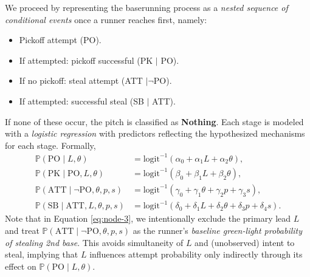 \documentclass[12pt,letterpaper]{article}
\renewcommand{\P}{\mathbb{P}}
\begin{document}
We proceed by representing the baserunning process as a \emph{nested sequence of conditional events} once a runner reaches first, namely:
\begin{itemize}
    \item Pickoff attempt (PO).
    \item If attempted: pickoff successful (PK $\mid$ PO).
    \item If no pickoff: steal attempt (ATT $\mid \neg$PO).
    \item If attempted: successful steal (SB $\mid$ ATT).
\end{itemize}
If none of these occur, the pitch is classified as \textbf{Nothing}. Each stage is modeled with a \emph{logistic regression} with predictors reflecting the hypothesized mechanisms for each stage. Formally,
\begin{align}
    \P(\text{PO}\mid L, \theta) &= \text{logit}^{-1}(\alpha_0 + \alpha_1 L + \alpha_2 \theta), \label{eq:node-1} \\
    \P(\text{PK}\mid \text{PO}, L, \theta) &= \text{logit}^{-1}(\beta_0 + \beta_1 L + \beta_2 \theta),\label{eq:node-2} \\
    \P(\text{ATT}\mid \neg\text{PO}, \theta, p, s) &= \text{logit}^{-1}(\gamma_0 + \gamma_1 \theta + \gamma_2 p + \gamma_3 s), \label{eq:node-3} \\
    \P(\text{SB}\mid \text{ATT}, L, \theta, p, s)&=\text{logit}^{-1}(\delta_0 + \delta_1 L + \delta_2 \theta + \delta_3 p + \delta_4 s). \label{eq:node-4}
\end{align}
Note that in Equation \ref{eq:node-3}, we intentionally exclude the primary lead $L$ and treat $\P(\text{ATT}\mid \neg\text{PO}, \theta, p, s)$ as the runner's \emph{baseline green-light probability of stealing 2nd base}. This avoids simultaneity of $L$ and (unobserved) intent to steal, implying that $L$ influences attempt probability only indirectly through its effect on $\P(\text{PO}\mid L,\theta)$.
\end{document}
